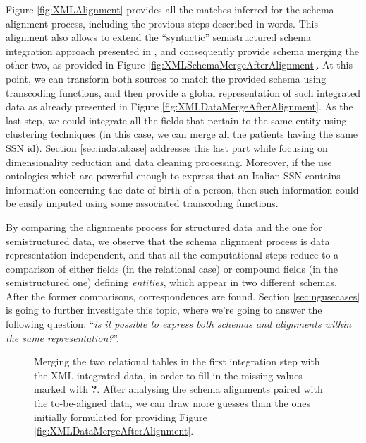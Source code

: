 Figure \ref{fig:XMLAlignment} provides all the matches inferred for the schema  alignment process, including the previous steps described in words. This alignment also allows to extend the ``syntactic'' semistructured schema integration approach presented in  \cite{BaaziziLCGS17}, and consequently provide schema merging the other two, as provided in Figure \ref{fig:XMLSchemaMergeAfterAlignment}. At this point, we can transform both sources  to match the provided schema using transcoding functions, and then provide a global representation of such integrated data as already presented in Figure \vref{fig:XMLDataMergeAfterAlignment}. As the last step, we could integrate all the fields that pertain to the same entity using clustering techniques (in this case, we can merge all the patients having the same SSN id). Section \ref{sec:indatabase} addresses this last part while focusing on dimensionality reduction and data cleaning processing. Moreover, if the use ontologies which are powerful enough to express that an Italian SSN contains information concerning the date of birth of a person, then such information could be easily imputed using some associated transcoding functions.

By comparing the alignments  process for structured data and the one for semistructured data, we observe that the schema alignment process is  data representation independent, and that all the computational steps reduce to a comparison of either fields (in the relational case) or compound fields (in the semistructured one) defining \textit{entities}, which appear in two different schemas. After the former comparisons, correspondences are found.
Section \vref{sec:ngusecases}  is going to further investigate this topic,  where we're going to answer the following question: ``\textit{is it possible to express both schemas and alignments within the same representation?}''.

\begin{figure}
  
  \caption{Merging the two relational tables in the first integration step with the XML integrated data, in order to fill in the missing values marked with {\color{red}\textbf{?}}. After analysing the schema alignments paired with the to-be-aligned data, we can draw more guesses than the ones initially formulated for providing Figure \vref{fig:XMLDataMergeAfterAlignment}.}
  \label{fig:XMLDataMergeWithTheTwoTables}
\end{figure}

